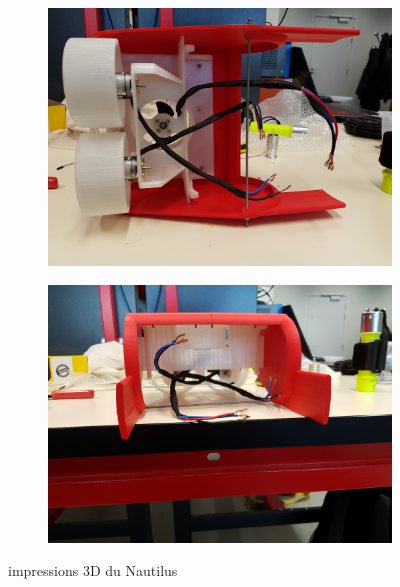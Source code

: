 \documentclass[a4paper,11pt]{report}
\begin{document}
					\begin{figure}[!h]
						\centering
							\begin{subfigure}[b]{0.3\textwidth}
								\includegraphics[width=\textwidth]{Photos/Capture13.jpg}
							\end{subfigure}
							\begin{subfigure}[b]{0.3\textwidth}
								\includegraphics[width=\textwidth]{Photos/Capture14.jpg}
							\end{subfigure}
							\caption{impressions 3D du Nautilus}
					\end{figure}
\end{document}
